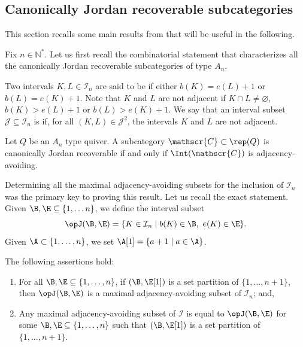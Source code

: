 \subsection{Canonically Jordan recoverable subcategories}
    \label{ss:AllCJRtypeA}

    This section recalls some main results from \cite{D23} that will be useful in the following.

    Fix $n \in \mathbb{N}^*$. Let us first recall the combinatorial statement that characterizes all the canonically Jordan recoverable subcategories of type $A_n$.

    Two intervals $K,L \in \mathcal{I}_n$ are said to be  if either $b(K) = e(L)+1$ or $b(L) = e(K)+1$. Note that $K$ and $L$ are not adjacent if $K \cap L \neq \varnothing$, $b(K) > e(L)+1$ or $b(L) > e(K)+1$. We say that an interval subset $\mathscr{J} \subseteq \mathcal{I}_n$ is  if, for all $(K,L) \in \mathscr{J}^2$, the intervals $K$ and $L$ are not adjacent.

\begin{theorem} \label{thm:typeACJRcombi}Let $Q$ be an $A_n$ type quiver. A subcategory $\mathscr{C} \subset \rep(Q)$ is canonically Jordan recoverable if and only if $\Int(\mathscr{C})$ is adjacency-avoiding.
\end{theorem}

Determining all the maximal adjacency-avoiding subsets for the inclusion of $\mathcal{I}_n$ was the primary key to proving this result. Let us recall the exact statement. Given $\B, \E \subseteq \{1,\ldots n\}$, we define the interval subset \[\opJ(\B,\E) = \{K \in \mathcal{I}_n \mid b(K) \in \B,\ e(K) \in \E\}.\] Given $\A \subset\{1,\ldots,n\}$, we set $\A[1] = \{a+1 \mid a \in \A\}$.

\begin{prop} \label{prop:allmaxadjavo} The following assertions hold:
    \begin{enumerate}[label = $(\roman*)$,itemsep=1mm]
        \item For all $\B,\E \subseteq \{1,\ldots,n\}$, if $(\B,\E[1])$ is a set partition of $\{1,\ldots,n+1\}$, then $\opJ(\B,\E)$ is a maximal adjacency-avoiding subset of $\mathcal{I}_n$; and,
        \item Any maximal adjacency-avoiding subset of $\mathcal{I}$ is equal to $\opJ(\B,\E)$ for some $\B,\E \subseteq \{1,\ldots,n\}$ such that $(\B,\E[1])$ is a set partition of $\{1,\ldots,n+1\}$.
    \end{enumerate}
\end{prop}

